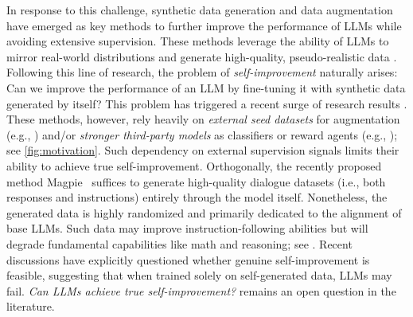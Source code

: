 In response to this challenge, synthetic data generation and data augmentation have emerged as key methods to further improve the performance of LLMs while avoiding extensive supervision. These methods leverage the ability of LLMs to mirror real-world distributions and generate high-quality, pseudo-realistic data \cite{DBLP:conf/iclr/ZhangCSDTG23}. Following this line of research, the problem of \emph{self-improvement} naturally arises: Can we improve the performance of an LLM by fine-tuning it with synthetic data generated by itself?
This problem has triggered a recent surge of research results \cite{DBLP:journals/corr/abs-2410-12896}. These methods, however, rely heavily on \emph{external seed datasets} for augmentation (e.g., \cite{DBLP:conf/emnlp/0001GHW00023,DBLP:conf/acl/WangKMLSKH23}) and/or \emph{stronger third-party models} as classifiers or reward agents (e.g., \cite{DBLP:conf/nips/Le0GSH22,DBLP:journals/corr/abs-2405-14333}); see \cref{fig:motivation}. Such dependency on external supervision signals limits their ability to achieve true self-improvement. Orthogonally, the recently proposed method Magpie~\cite{DBLP:journals/corr/abs-2406-08464} suffices to generate high-quality dialogue datasets (i.e., both responses and instructions) entirely through the model itself. 
Nonetheless, the generated data is highly randomized and primarily dedicated to the alignment of 
base LLMs. Such data may improve instruction-following abilities but will degrade fundamental capabilities like math and reasoning; see \cite[Sect.~6]{DBLP:journals/corr/abs-2406-08464}. Recent discussions \cite{DBLP:conf/icml/KambhampatiVGVS24,DBLP:journals/nature/ShumailovSZPAG24} have explicitly questioned whether genuine self-improvement is feasible, suggesting that when trained solely on self-generated data, LLMs may fail. \emph{Can LLMs achieve true self-improvement?} remains an open question in the literature.

